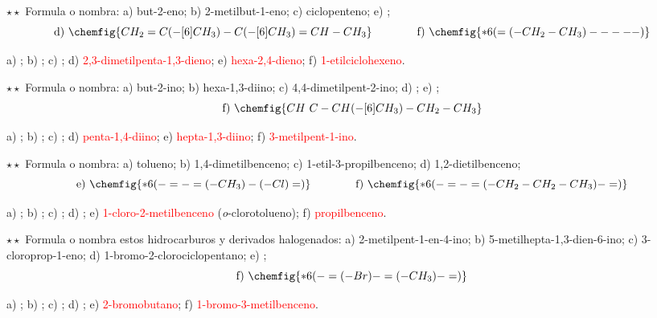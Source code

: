 \begin{exercise}
    \(\star\star\) Formula o nombra: a) but-2-eno; b) 2-metilbut-1-eno; c) ciclopenteno; e) ;
    \[ \text{d)}\ \chemfig{CH_2=C(-[6]CH_3)-C(-[6]CH_3)=CH-CH_3} \qquad\qquad \text{f)}\ \chemfig{*6(=(-CH_2-CH_3)-----)} \]
    \begin{solu}
        a) \textcolor{red}{}; b) \textcolor{red}{}; c) \textcolor{red}{};
        d) \textcolor{red}{2,3-dimetilpenta-1,3-dieno}; e) \textcolor{red}{hexa-2,4-dieno}; f) \textcolor{red}{1-etilciclohexeno}.
    \end{solu}
\end{exercise}

\begin{exercise}
    \(\star\star\) Formula o nombra: a) but-2-ino; b) hexa-1,3-diino; c) 4,4-dimetilpent-2-ino; d) ;
    e) ;
    \[ \text{f)}\ \chemfig{CH~C-CH(-[6]CH_3)-CH_2-CH_3} \]
    \begin{solu}
        a) \textcolor{red}{}; b) \textcolor{red}{};
        c) \textcolor{red}{}; d) \textcolor{red}{penta-1,4-diino};
        e) \textcolor{red}{hepta-1,3-diino}; f) \textcolor{red}{3-metilpent-1-ino}.
    \end{solu}
\end{exercise}

\begin{exercise}
    \(\star\star\) Formula o nombra: a) tolueno; b) 1,4-dimetilbenceno; c) 1-etil-3-propilbenceno; d) 1,2-dietilbenceno;
    \[ \text{e)}\ \chemfig{*6(-=-=(-CH_3)-(-Cl)=)} \qquad\qquad \text{f)}\ \chemfig{*6(-=-=(-CH_2-CH_2-CH_3)-=)} \]
    \begin{solu}
        a) \textcolor{red}{}; b) \textcolor{red}{};
        c) \textcolor{red}{};
        d) \textcolor{red}{};
        e) \textcolor{red}{1-cloro-2-metilbenceno} (\emph{o}-clorotolueno); f) \textcolor{red}{propilbenceno}.
    \end{solu}
\end{exercise}

\begin{exercise}
    \(\star\star\) Formula o nombra estos hidrocarburos y derivados halogenados: a) 2-metilpent-1-en-4-ino; b)
    5-metilhepta-1,3-dien-6-ino; c) 3-cloroprop-1-eno; d) 1-bromo-2-clorociclopentano; e) ;
    \[ \text{f)}\ \chemfig{*6(-=(-Br)-=(-CH_3)-=)} \]
    \begin{solu}
        a) \textcolor{red}{}; b) \textcolor{red}{};
        c) \textcolor{red}{}; d) \textcolor{red}{}; e) \textcolor{red}{2-bromobutano};
        f) \textcolor{red}{1-bromo-3-metilbenceno}.
    \end{solu}
\end{exercise}

